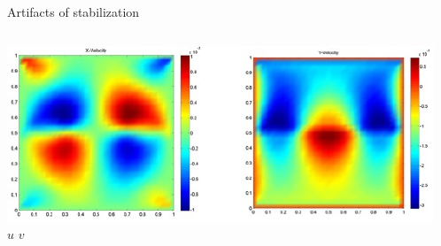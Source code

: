\begin{frame}{Artifacts of stabilization}
\begin{columns}
\begin{column}{0.6\textwidth}
        \includegraphics[width=\textwidth]{figures/Stabilization/Q1Q1stab} \\
        \vbox{\hspace{4em} $u$ \hspace{8em} $v$}
    \end{column}
  \end{columns}
\end{frame}
